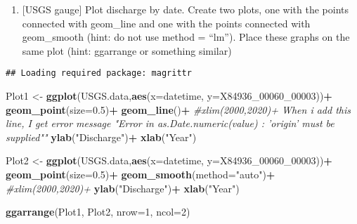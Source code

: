 \documentclass[]{article}
\newenvironment{Shaded}{\begin{snugshade}}{\end{snugshade}}
\newcommand{\KeywordTok}[1]{\textcolor[rgb]{0.13,0.29,0.53}{\textbf{#1}}}
\newcommand{\DataTypeTok}[1]{\textcolor[rgb]{0.13,0.29,0.53}{#1}}
\newcommand{\DecValTok}[1]{\textcolor[rgb]{0.00,0.00,0.81}{#1}}
\newcommand{\FloatTok}[1]{\textcolor[rgb]{0.00,0.00,0.81}{#1}}
\newcommand{\StringTok}[1]{\textcolor[rgb]{0.31,0.60,0.02}{#1}}
\newcommand{\CommentTok}[1]{\textcolor[rgb]{0.56,0.35,0.01}{\textit{#1}}}
\newcommand{\OperatorTok}[1]{\textcolor[rgb]{0.81,0.36,0.00}{\textbf{#1}}}
\newcommand{\NormalTok}[1]{#1}
\providecommand{\tightlist}{%
  \setlength{\itemsep}{0pt}\setlength{\parskip}{0pt}}
\begin{document}
\begin{enumerate}
\def\labelenumi{\arabic{enumi}.}
\setcounter{enumi}{5}
\tightlist
\item
  {[}USGS gauge{]} Plot discharge by date. Create two plots, one with
  the points connected with geom\_line and one with the points connected
  with geom\_smooth (hint: do not use method = ``lm''). Place these
  graphs on the same plot (hint: ggarrange or something similar)
\end{enumerate}

\begin{Shaded}
\end{Shaded}

\begin{verbatim}
## Loading required package: magrittr
\end{verbatim}

\begin{Shaded}
\begin{Highlighting}[]
\NormalTok{Plot1 <-}\StringTok{ }\KeywordTok{ggplot}\NormalTok{(USGS.data,}\KeywordTok{aes}\NormalTok{(}\DataTypeTok{x=}\NormalTok{datetime, }\DataTypeTok{y=}\NormalTok{X84936_00060_}\DecValTok{00003}\NormalTok{))}\OperatorTok{+}
\StringTok{  }\KeywordTok{geom_point}\NormalTok{(}\DataTypeTok{size=}\FloatTok{0.5}\NormalTok{)}\OperatorTok{+}
\StringTok{  }\KeywordTok{geom_line}\NormalTok{()}\OperatorTok{+}
\StringTok{  }\CommentTok{#xlim(2000,2020)+ When i add this line, I get error message "Error in as.Date.numeric(value) : 'origin' must be supplied""}
\StringTok{  }\KeywordTok{ylab}\NormalTok{(}\StringTok{"Discharge"}\NormalTok{)}\OperatorTok{+}
\StringTok{  }\KeywordTok{xlab}\NormalTok{(}\StringTok{"Year"}\NormalTok{)}

\NormalTok{Plot2 <-}\StringTok{ }\KeywordTok{ggplot}\NormalTok{(USGS.data,}\KeywordTok{aes}\NormalTok{(}\DataTypeTok{x=}\NormalTok{datetime, }\DataTypeTok{y=}\NormalTok{X84936_00060_}\DecValTok{00003}\NormalTok{))}\OperatorTok{+}
\StringTok{  }\KeywordTok{geom_point}\NormalTok{(}\DataTypeTok{size=}\FloatTok{0.5}\NormalTok{)}\OperatorTok{+}
\StringTok{  }\KeywordTok{geom_smooth}\NormalTok{(}\DataTypeTok{method=}\StringTok{"auto"}\NormalTok{)}\OperatorTok{+}\StringTok{  }
\StringTok{  }\CommentTok{#xlim(2000,2020)+}
\StringTok{  }\KeywordTok{ylab}\NormalTok{(}\StringTok{"Discharge"}\NormalTok{)}\OperatorTok{+}
\StringTok{  }\KeywordTok{xlab}\NormalTok{(}\StringTok{"Year"}\NormalTok{)}

\KeywordTok{ggarrange}\NormalTok{(Plot1, Plot2, }\DataTypeTok{nrow=}\DecValTok{1}\NormalTok{, }\DataTypeTok{ncol=}\DecValTok{2}\NormalTok{)}
\end{Highlighting}
\end{Shaded}
\end{document}
